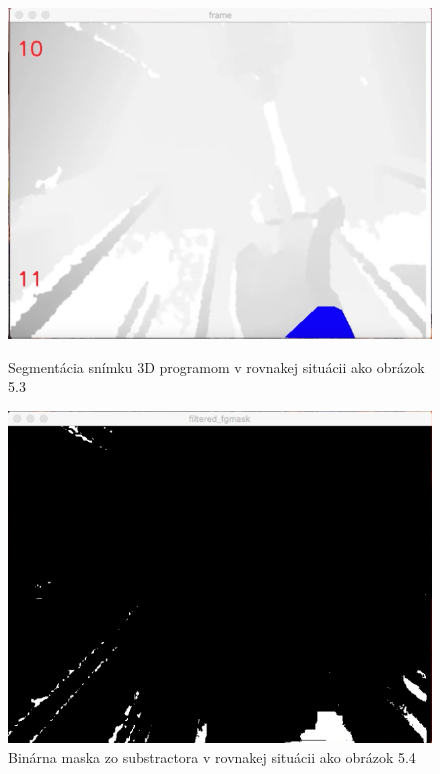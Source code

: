 \begin{figure}[H]
  \centering
  \begin{minipage}[b]{0.43\textwidth}
    \includegraphics[width=\textwidth]{images/handCard_3D}
    \caption{Segmentácia snímku 3D programom v rovnakej situácii ako obrázok 5.3}
  \end{minipage}
  \hfill
  \begin{minipage}[b]{0.43\textwidth}
    \includegraphics[width=\textwidth]{images/handCard_fmask_3D}
    \caption{Binárna maska zo substractora  v rovnakej situácii ako obrázok 5.4}
  \end{minipage}
\end{figure}  

